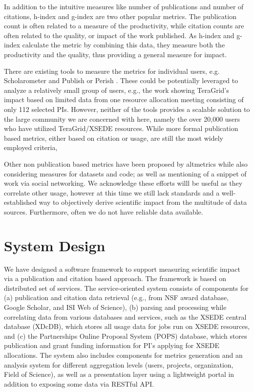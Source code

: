 \documentclass{sig-alternate}
\begin{document}
In addition to the intuitive measures like number of publications and number of citations, h-index \cite{hirsch2005index} and g-index \cite{egghe2006theory} are two other popular metrics. The publication count is often related to a measure of the productivity, while citation counts are often related to the quality, or impact of the work published. As h-index and g-index calculate the metric by combining this data, they measure both the productivity and the quality, thus providing a general measure for impact.

There are existing tools to measure the metrics for individual users, e.g. Scholarometer \cite{kaur2012scholarometer} and Publish or Perish \cite{www-pop}. These could be potentially leveraged to analyze a relatively small group of users, e.g., the work \cite{bollen2011and} showing TeraGrid's impact based on limited data from one resource allocation meeting consisting of only 112 selected PIs.  However, neither of the tools provides a scalable solution to the large community we are concerned with here, namely the over 20,000 users who have utilized TeraGrid/XSEDE resources.  While more formal publication based metrics, either based on citation or usage, are still the most widely employed criteria, 

Other non publication based metrics have been proposed by altmetrics \cite{www-altmetrics} while also considering measures for datasets and code; as well as mentioning of a snippet of work via social networking. We acknowledge these efforts willl be useful as they correlate other usage, however at this time we still lack standards and a well-established way to objectively derive scientific impact from the multitude of data sources. Furthermore, often we do not have reliable data available.



\section{System Design} \label{S:design} We have designed a software framework to support measuring scientific impact via a publication and citation based approach. The framework is based on distributed set of services. The service-oriented system consists of components for (a) publication and citation data retrieval (e.g., from NSF award database, Google Scholar, and ISI Web of Science), (b) parsing and processing while correlating data from various databases and services, such as the XSEDE central database (XDcDB), which stores all usage data for jobs run on XSEDE resources, and (c) the Partnerships Online Proposal System (POPS) database, which stores publication and grant funding information for PI's applying for XSEDE allocations. The system also includes components for metrics generation and an analysis system for different aggregation levels (users, projects, organization, Field of Science), as well as a presentation layer using a lightweight portal in addition to exposing some data via RESTful API.
\end{document}
